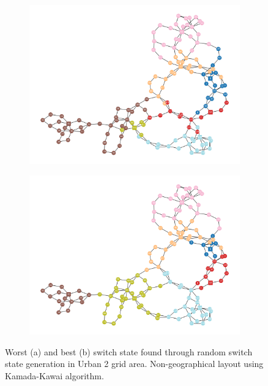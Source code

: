   \begin{figure}[H]
    \begin{subfigure}{.5\textwidth}
        \centering
        \includegraphics[width=\linewidth]{img/switchstate_exploring/urban2/topology_worst.png}
        \caption{}
        \label{fig:result:urban2:worst}
      \end{subfigure}%
      \begin{subfigure}{.5\textwidth}
        \centering
        \includegraphics[width=\linewidth]{img/switchstate_exploring/urban2/topology_best.png}
        \caption{}
        \label{fig:result:urban2:best}
      \end{subfigure}
    \caption{
      Worst (a) and best (b) switch state found through random switch
      state generation in Urban 2 grid area. 
      Non-geographical layout using
      Kamada-Kawai algorithm\autocite{kamada_kawai}.
    }
  \end{figure}
  
